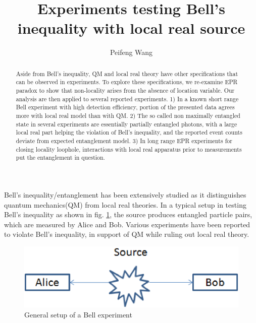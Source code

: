 \documentclass[prd,showpacs,twocolumn]{revtex4-1}
\begin{document}
\title{Experiments testing Bell's inequality with local real source}
\author{Peifeng Wang}
\address{Mijiaqiao 34-1-3-5, Xi'an, Shaanxi, P. R. China 710075}
\address{Guanghua Road 1\#, 34-1-3-5, Yanta District, Xi'an, Shaanxi, P. R. China 710075}
\begin{abstract}
Aside from Bell's inequality, QM and local real theory have other specifications that can be observed in experiments. To explore these specifications, we re-examine EPR paradox to show that non-locality arises from the absence of location variable. Our analysis are then applied to several reported experiments. 1) In a known short range Bell experiment with high detection efficiency, portion of the presented data agrees more with local real model than with QM. 2) The so called non maximally entangled state in several experiments are essentially partially entangled photons, with a large local real part helping the violation of Bell's inequality, and the reported event counts deviate from expected entanglement model. 3) In long range EPR experiments for closing locality loophole, interactions with local real apparatus prior to measurements put the entanglement in question.
\end{abstract}
\maketitle

Bell's inequality\cite{Bell,CHSH}/entanglement has been extensively studied\cite{Aspect,Weihs, Rowe, Cavalcanti, Branciard} as it distinguishes quantum mechanics(QM) from local real theories. In a typical setup in testing Bell's inequality as shown in fig. \ref{fig:General}, the source produces entangled particle pairs, which are measured by Alice and Bob. Various experiments have been reported to violate Bell's inequality, in support of QM while ruling out local real theory.

\begin{figure}
\includegraphics[scale=0.7]{general-png.eps}
\caption{General setup of a Bell experiment}
\label{fig:General}
\end{figure}
\end{document}
